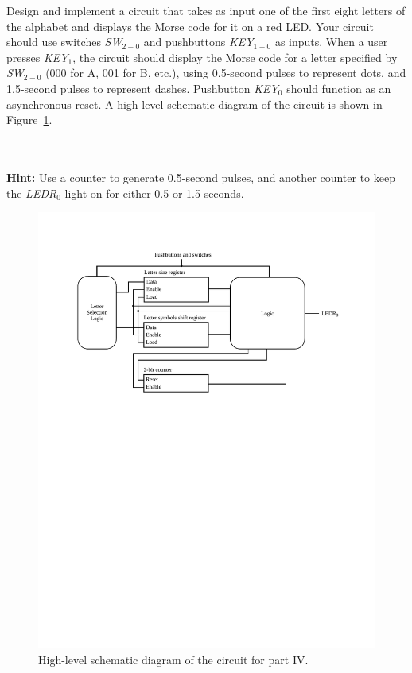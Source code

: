 \documentclass[epsfig,10pt,fullpage]{article}
\newcommand{\CommonDocsPath}{../../../common/docs}
\begin{document}
Design and implement a circuit that takes as input one of the first eight letters of the 
alphabet and displays the Morse code for it on a red LED. Your circuit should use 
switches {\it SW}$_{2-0}$ and pushbuttons {\it KEY}$_{1-0}$ as inputs. When a user 
presses {\it KEY}$_1$, the circuit should display the Morse code for a letter specified 
by {\it SW}$_{2-0}$ (000 for A, 001 for B, etc.), using 0.5-second pulses to represent dots, 
and 1.5-second pulses to represent dashes. Pushbutton {\it KEY}$_0$ should function as 
an asynchronous reset. A high-level schematic diagram of the circuit is shown in 
Figure~\ref{fig:morse_code_cct}.

~\\
~\\
{\bf Hint:} Use a counter to generate 0.5-second pulses, and another counter to keep 
the {\it LEDR}$_0$ light on for either 0.5 or 1.5 seconds.

\begin{figure}
\begin{center}
	\includegraphics[scale = 0.9]{figures/fig_morse_code_circuit_schematic.pdf}
\end{center}
\caption{High-level schematic diagram of the circuit for part IV.}
\label{fig:morse_code_cct}
\end{figure}



\end{document}
